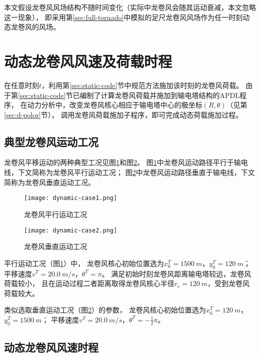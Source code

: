 本文假设龙卷风风场结构不随时间变化（实际中龙卷风会随其运动衰减，本文忽略这一现象），
即采用第\ref{sec:full-tornado}中模拟的足尺龙卷风风场作为任一时刻动态龙卷风的风场。

\section{动态龙卷风风速及荷载时程}

在任意时刻$t$，利用第\ref{sec:static-code}节中规范方法施加该时刻的龙卷风荷载。
由于第\ref{sec:static-code}节已编制了计算龙卷风荷载并施加到输电塔结构的APDL程序，
在动力分析中，改变龙卷风核心相应于输电塔中心的极坐标$(R,\theta)$（见第\ref{sec:d-polor}节），
调用龙卷风荷载施加子程序，即可完成动态荷载施加过程。

\subsection{典型龙卷风运动工况}

龙卷风平移运动的两种典型工况见图\ref{fig:dynamic-case1}和图\ref{fig:dynamic-case2}。
图\ref{fig:dynamic-case1}中龙卷风运动路径平行于输电线，下文简称为龙卷风平行运动工况；
图\ref{fig:dynamic-case2}中龙卷风运动路径垂直于输电线，下文简称为龙卷风垂直运动工况。

\begin{figure}[!htpb]
    \centering
    \texttt{[image: dynamic-case1.png]}
    \caption{龙卷风平行运动工况}
    \label{fig:dynamic-case1}
\end{figure}
\begin{figure}[!htpb]
    \centering
    \texttt{[image: dynamic-case2.png]}
    \caption{龙卷风垂直运动工况}
    \label{fig:dynamic-case2}
\end{figure}

平行运动工况（图\ref{fig:dynamic-case1}）中，
龙卷风核心初始位置选为$x_0^T=\SI{1500}{m}$，$y_0^T=\SI{120}{m}$；
平移速度$v^T=\SI{20.0}{m/s}$，$\theta^T=\pi$。
满足初始时刻龙卷风距离输电塔较远，龙卷风荷载较小，
且在运动过程二者距离取得龙卷风核心半径$r_c=\SI{120}{m}$，受到龙卷风荷载较大。

类似选取垂直运动工况（图\ref{fig:dynamic-case2}）的参数，
龙卷风核心初始位置选为$x_0^T=\SI{120}{m}$，$y_0^T=\SI{1500}{m}$；
平移速度$v^T=\SI{20.0}{m/s}$，$\theta^T=-\frac{1}{2}\pi$。

\subsection{动态龙卷风风速时程}

